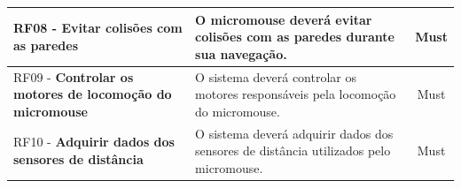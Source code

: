 \begin{center}
\begin{longtable}{|p{5.5cm}|p{8cm}|c|}
    RF08 - \textbf{Evitar colisões com as paredes} & O micromouse deverá evitar colisões com as paredes durante sua navegação. & Must \\ \hline

    RF09 - \textbf{Controlar os motores de locomoção do micromouse} & O sistema deverá controlar os motores responsáveis pela locomoção do micromouse. & Must \\ \hline

    RF10 - \textbf{Adquirir dados dos sensores de distância} & O sistema deverá adquirir dados dos sensores de distância utilizados pelo micromouse. & Must \\ \hline

    \end{longtable}
    \end{center}

